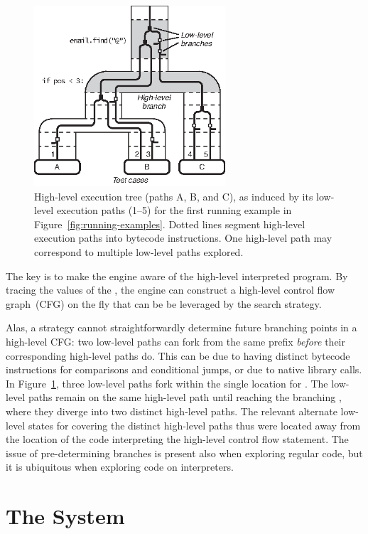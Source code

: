 \begin{figure}
  \centering
  \includegraphics[width=2.8in]{figures/chef/hl-symbex}
  \caption{High-level execution tree (paths A, B, and C), as induced by its low-level execution paths (1--5) for the first running example in Figure~\ref{fig:running-examples}.  Dotted lines segment high-level execution paths into bytecode instructions.  One high-level path may correspond to multiple low-level paths explored.}
  \label{fig:hl-symbex}
\end{figure}

The key is to make the engine aware of the high-level interpreted program. By tracing the values of the \hlpc, the engine can construct a high-level control flow graph~(CFG) on the fly that can be be leveraged by the search strategy.

Alas, a strategy cannot straightforwardly determine future branching points in a high-level CFG: two low-level paths can fork from the same prefix \emph{before} their corresponding high-level paths do.  This can be due to having distinct bytecode instructions for comparisons and conditional jumps, or due to native library calls.  
%
In Figure~\ref{fig:hl-symbex}, three low-level paths fork within the single \hlpc location for . The low-level paths remain on the same high-level path until reaching the branching \hlpc, where they diverge into two distinct high-level paths. The relevant alternate low-level states for covering the distinct high-level paths thus were located away from the location of the code interpreting the high-level control flow statement.
%
The issue of pre-determining branches is present also when exploring regular code, but it is ubiquitous when exploring code on interpreters.

\section{The \chef System}

